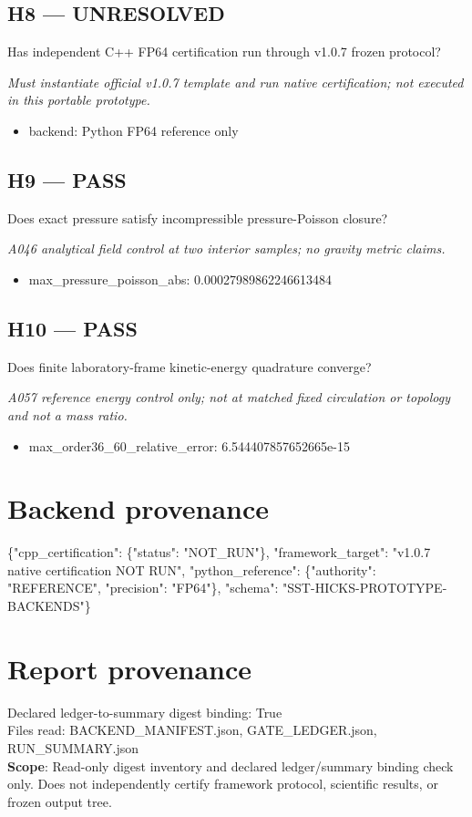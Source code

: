 \documentclass[10pt,a4paper]{article}
\begin{document}
\subsection*{H8 --- UNRESOLVED}
Has independent C++ FP64 certification run through v1.0.7 frozen protocol?
\par\textit{Must instantiate official v1.0.7 template and run native certification; not executed in this portable prototype.}\par
\begin{itemize}
\item backend: Python FP64 reference only
\end{itemize}
\subsection*{H9 --- PASS}
Does exact pressure satisfy incompressible pressure-Poisson closure?
\par\textit{A046 analytical field control at two interior samples; no gravity metric claims.}\par
\begin{itemize}
\item max\_pressure\_poisson\_abs: 0.00027989862246613484
\end{itemize}
\subsection*{H10 --- PASS}
Does finite laboratory-frame kinetic-energy quadrature converge?
\par\textit{A057 reference energy control only; not at matched fixed circulation or topology and not a mass ratio.}\par
\begin{itemize}
\item max\_order36\_60\_relative\_error: 6.544407857652665e-15
\end{itemize}
\section*{Backend provenance}
\{"cpp\_certification": \{"status": "NOT\_RUN"\}, "framework\_target": "v1.0.7 native certification NOT RUN", "python\_reference": \{"authority": "REFERENCE", "precision": "FP64"\}, "schema": "SST-HICKS-PROTOTYPE-BACKENDS"\}
\section*{Report provenance}
Declared ledger-to-summary digest binding: True\\
Files read: BACKEND\_MANIFEST.json, GATE\_LEDGER.json, RUN\_SUMMARY.json\\
\textbf{Scope}: Read-only digest inventory and declared ledger/summary binding check only. Does not independently certify framework protocol, scientific results, or frozen output tree.
\end{document}
